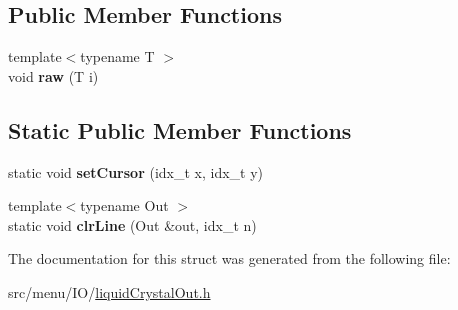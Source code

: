 \subsection*{Public Member Functions}
\begin{DoxyCompactItemize}
\item 
\mbox{\label{structLiquidCrystalOut_ad4a4f2eb89f2668019860c3130fd0712}} 
{\footnotesize template$<$typename T $>$ }\\void {\bfseries raw} (T i)
\end{DoxyCompactItemize}
\subsection*{Static Public Member Functions}
\begin{DoxyCompactItemize}
\item 
\mbox{\label{structLiquidCrystalOut_ae913f308ae361afba546e7f23c2cad55}} 
static void {\bfseries set\+Cursor} (idx\+\_\+t x, idx\+\_\+t y)
\item 
\mbox{\label{structLiquidCrystalOut_aedc93cdd2c7a7dcaa98079ad4f4bf584}} 
{\footnotesize template$<$typename Out $>$ }\\static void {\bfseries clr\+Line} (Out \&out, idx\+\_\+t n)
\end{DoxyCompactItemize}


The documentation for this struct was generated from the following file\+:\begin{DoxyCompactItemize}
\item 
src/menu/\+I\+O/\hyperlink{liquidCrystalOut_8h}{liquid\+Crystal\+Out.\+h}\end{DoxyCompactItemize}
